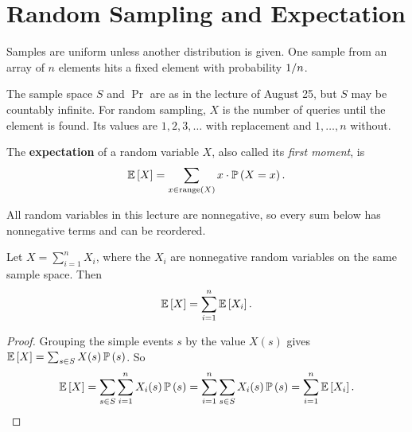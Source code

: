 \section{Random Sampling and Expectation}

%
Samples are uniform unless another distribution is given. One sample from an array of $n$ elements
hits a fixed element with probability $1/n$.

The sample space $S$ and $\Pr$ are as in the lecture of August 25, but $S$ may be countably
infinite. For random sampling, $X$ is the number of queries until the element is found. Its values
are $1, 2, 3, \dots$ with replacement and $1, \dots, n$ without.

\begin{definition}[Expectation]\label{def:expectation-0827}
    The \textbf{expectation} of a random variable $X$, also called its \emph{first moment}, is
    \[\expectation{X} = \sum_{x \in \operatorname{range}(X)} x \cdot \prob{X = x}.\]
\end{definition}

All random variables in this lecture are nonnegative, so every sum below has nonnegative terms and
can be reordered.

\begin{theorem}\label{thm:linearity-0827}
    Let $X = \sum_{i=1}^{n} X_i$, where the $X_i$ are nonnegative random variables on the same
    sample space. Then
    \[\expectation{X} = \sum_{i=1}^{n} \expectation{X_i}.\]
\end{theorem}

\begin{proof}
    Grouping the simple events $s$ by the value $X(s)$ gives
    $\expectation{X} = \sum_{s \in S} X(s) \prob{s}$. So
    \[\expectation{X} = \sum_{s \in S} \sum_{i=1}^{n} X_i(s) \prob{s}
        = \sum_{i=1}^{n} \sum_{s \in S} X_i(s) \prob{s} = \sum_{i=1}^{n} \expectation{X_i}.\]
\end{proof}

